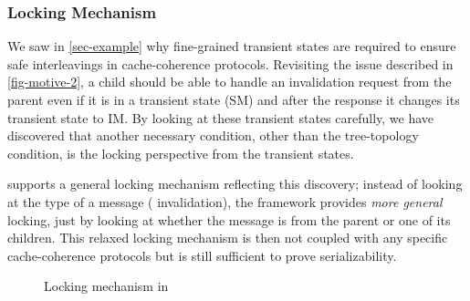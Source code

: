 \documentclass[sigplan,10pt,review,anonymous,screen]{acmart}\settopmatter{printfolios=true,printccs=false,printacmref=false}
\begin{document}
\subsubsection{Locking Mechanism}
\label{sec-locking-mechanism}

We saw in \autoref{sec-example} why fine-grained transient states are required to ensure safe interleavings in cache-coherence protocols.
Revisiting the issue described in \autoref{fig-motive-2}, a child should be able to handle an invalidation request from the parent even if it is in a transient state (SM) and after the response it changes its transient state to IM.
By looking at these transient states carefully, we have discovered that another necessary condition, other than the tree-topology condition, is the locking perspective from the transient states.

\hemiola{} supports a general locking mechanism reflecting this discovery;
instead of looking at the type of a message (\eg{} invalidation), the framework provides \emph{more general} locking, just by looking at whether the message is from the parent or one of its children.
This relaxed locking mechanism is then not coupled with any specific cache-coherence protocols but is still sufficient to prove serializability.

\begin{figure}[h]
  \caption{Locking mechanism in \hemiola{}}
  \label{fig-locking}
\end{figure}
\end{document}
